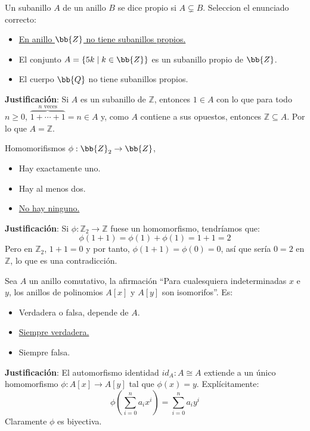 \begin{ejercicio}
    Un subanillo $A$ de un anillo $B$ se dice propio si $A \subsetneq B$. Seleccion el enunciado correcto:
    \begin{itemize}
        \item \underline{En anillo $\bb{Z}$ no tiene subanillos propios.}
        \item El conjunto $A = \{ 5k \mid k \in \bb{Z} \}$ es un subanillo propio de $\bb{Z}$.
        \item El cuerpo $\bb{Q}$ no tiene subanillos propios.
    \end{itemize}

    \noindent
    \textbf{Justificación}:
    Si $A$ es un subanillo de $\mathbb{Z}$, entonces $1 \in A$ con lo que para todo $n \geq 0$, $\overbrace{1+\cdots+1}^{n \text{\ veces}}=n \in A$ y, como $A$ contiene a sus opuestos, entonces $\mathbb{Z}\subseteq A$. Por lo que $A = \mathbb{Z}$.
\end{ejercicio}

\begin{ejercicio}
    Homomorifismos $\phi : \bb{Z}_2 \rightarrow \bb{Z}$,
    \begin{itemize}
        \item Hay exactamente uno.
        \item Hay al menos dos.
        \item \underline{No hay ninguno.}
    \end{itemize}

    \noindent
    \textbf{Justificación}:
    Si $\phi:\mathbb{Z}_2\to \mathbb{Z}$ fuese un homomorfismo, tendríamos que:
    \begin{equation*}
        \phi(1+1) = \phi(1) + \phi(1) = 1+1 = 2
    \end{equation*}
    Pero en $\mathbb{Z}_2$, $1+1=0$ y por tanto, $\phi(1+1)=\phi(0)=0$, así que sería $0 = 2$ en $\mathbb{Z}$, lo que es una contradicción.
\end{ejercicio}

\begin{ejercicio}
    Sea $A$ un anillo comutativo, la afirmación ``Para cualesquiera indeterminadas $x$ e $y$, los anillos de polinomios $A[x]$ y $A[y]$ son isomorifos''. Es:
    \begin{itemize}
        \item Verdadera o falsa, depende de $A$.
        \item \underline{Siempre verdadera.}
        \item Siempre falsa.
    \end{itemize}

    \noindent
    \textbf{Justificación}:
    El automorfismo identidad $id_A:A \cong A$ extiende a un único homomorfismo $\phi:A[x]\to A[y]$ tal que $\phi(x)=y$. Explícitamente:
    \begin{equation*}
        \phi\left(\sum_{i=0}^{n} a_i x^i\right) = \sum_{i=0}^{n} a_i y^i
    \end{equation*}
    Claramente $\phi$ es biyectiva.
\end{ejercicio}

\newpage
\resetearcontador

